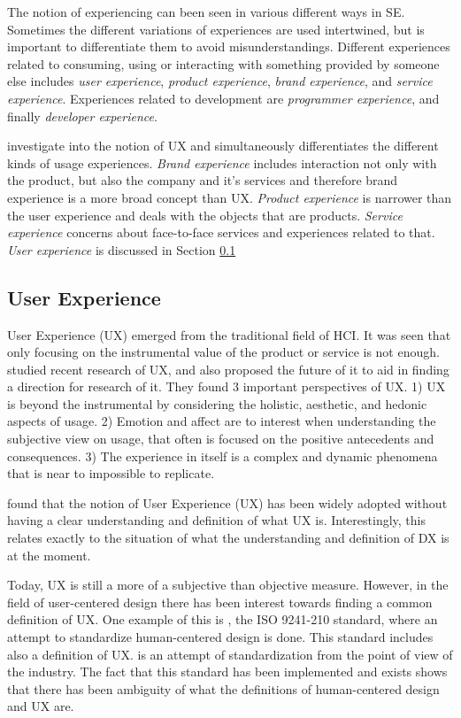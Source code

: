 \documentclass[english, 12pt, a4paper, sci, utf8, a-1b, online]{aaltothesis}
\begin{document}
The notion of experiencing can been seen in various different ways in SE. Sometimes the different variations of experiences are used intertwined, but is important to differentiate them to avoid misunderstandings. Different experiences related to consuming, using or interacting with something provided by someone else includes \textit{user experience}, \textit{product experience}, \textit{brand experience}, and \textit{service experience}. Experiences related to development are \textit{programmer experience}, and finally \textit{developer experience}.

\textcite{understanding-ux} investigate into the notion of UX and simultaneously differentiates the different kinds of usage experiences. \textit{Brand experience} includes interaction not only with the product, but also the company and it's services and therefore brand experience is a more broad concept than UX. \textit{Product experience} is narrower than the user experience and deals with the objects that are products. \textit{Service experience} concerns about face-to-face services and experiences related to that. \textit{User experience} is discussed in Section \ref{section:ux}

\subsection{User Experience} \label{section:ux}

User Experience (UX) emerged from the traditional field of HCI. It was seen that only focusing on the instrumental value of the product or service is not enough. \textcite{ux-research-agenda} studied recent research of UX, and also proposed the future of it to aid in finding a direction for research of it. They found 3 important perspectives of UX. 1) UX is beyond the instrumental by considering the holistic, aesthetic, and hedonic aspects of usage. 2) Emotion and affect are to interest when understanding the subjective view on usage, that often is focused on the positive antecedents and consequences. 3) The experience in itself is a complex and dynamic phenomena that is near to impossible to replicate.

\textcite{understanding-ux} found that the notion of User Experience (UX) has been widely adopted without having a clear understanding and definition of what UX is. Interestingly, this relates exactly to the situation of what the understanding and definition of DX is at the moment.

Today, UX is still a more of a subjective than objective measure. However, in the field of user-centered design there has been interest towards finding a common definition of UX. One example of this is \textcite{iso-9241-210}, the ISO 9241-210 standard, where an attempt to standardize human-centered design is done. This standard includes also a definition of UX. \textcite{iso-9241-210} is an attempt of standardization from the point of view of the industry. The fact that this standard has been implemented and exists shows that there has been ambiguity of what the definitions of human-centered design and UX are.
\end{document}
